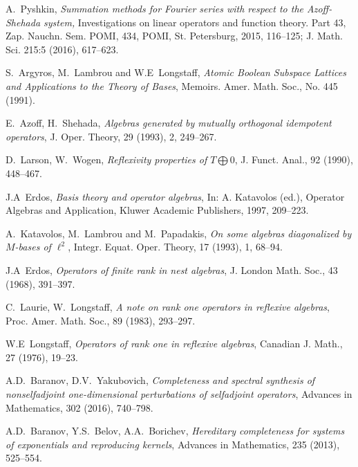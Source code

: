 \documentclass[a4paper,12pt]{article}
\numberwithin{prop_under_lemma}{lemma}
\begin{document}
\small
{}
\begin{thebibliography}{20}
    A.~\!Pyshkin,
    \emph{Summation methods for Fourier series with respect to the Azoff-Shehada system,}
    Investigations on linear operators and function theory.
    Part 43, Zap. Nauchn. Sem. POMI, 434, POMI, St. Petersburg, 2015, 116--125;
    J. Math. Sci. 215:5 (2016), 617--623.

    S.~\!Argyros, M.~\!Lambrou and W.E~\!Longstaff,
    \emph{Atomic Boolean Subspace Lattices and Applications to the Theory of Bases},
    Memoirs. Amer. Math. Soc., No. 445 (1991).

    E.~\!Azoff, H.~\!Shehada,
    \emph{Algebras generated by mutually orthogonal idempotent operators},
    J. Oper. Theory, 29 (1993), 2, 249--267.

    D.~\!Larson, W.~\!Wogen,
    \emph{Reflexivity properties of $T\bigoplus0$},
    J. Funct. Anal., 92 (1990), 448--467.

    J.A~\!Erdos,
    \emph{Basis theory and operator algebras},
    In: A. Katavolos (ed.), Operator Algebras and Application, Kluwer Academic Publishers, 1997, 209--223.

    A.~\!Katavolos, M.~\!Lambrou and M.~\!Papadakis,
    \emph{On some algebras diagonalized by $M$-bases of $\ell^2$},
    Integr. Equat. Oper. Theory, 17 (1993), 1, 68--94.

    J.A~\!Erdos,
    \emph{Operators of finite rank in nest algebras},
    J. London Math. Soc., 43 (1968), 391--397.

    C.~\!Laurie, W.~\!Longstaff,
    \emph{A note on rank one operators in reflexive algebras},
    Proc. Amer. Math. Soc., 89 (1983), 293--297.

    W.E~\!Longstaff,
    \emph{Operators of rank one in reflexive algebras},
    Canadian J. Math., 27 (1976), 19--23.

    A.D.~\!Baranov, D.V.~\!Yakubovich,
    \emph{Completeness and spectral synthesis of nonselfadjoint one-dimensional perturbations of selfadjoint operators},
    Advances in Mathematics, 302 (2016), 740--798.

    A.D.~\!Baranov, Y.S.~\!Belov, A.A.~\!Borichev,
    \emph{Hereditary completeness for systems of exponentials and reproducing kernels},
    Advances in Mathematics, 235 (2013), 525--554.

\end{thebibliography}
\end{document}
